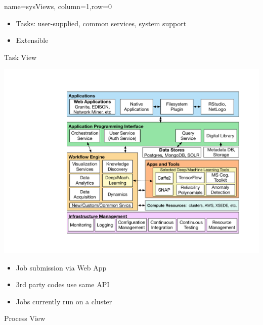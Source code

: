 \documentclass[landscape,paperwidth=70in,paperheight=46in,fontscale=0.225]{baposter} %
\begin{document}
\begin{poster}
{}


          {name=sysViews, column=1,row=0}{
          
\begin{minipage}{.3\textwidth}
\begin{itemize}[leftmargin=*,noitemsep,topsep=0pt]
\item Tasks:  user-supplied, common services, system support
\item Extensible
\end{itemize}
\end{minipage}
\hfill
\begin{minipage}{.7\textwidth}
Task View

\includegraphics[scale=0.2]{figures/CINSArchV7-v02.pdf} 
\end{minipage}

\begin{minipage}{.29\textwidth}
\begin{itemize}[leftmargin=*,noitemsep,topsep=0pt]
\item Job submission via Web App
\item 3rd party codes use same API
\item Jobs currently run on a cluster
\end{itemize}
\end{minipage}
\hfill
\begin{minipage}{.71\textwidth}
Process View


\end{minipage}}
\end{poster}
\end{document}
